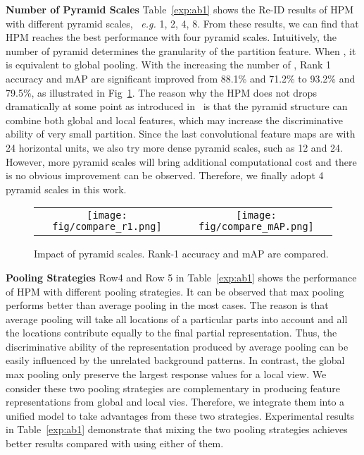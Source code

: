 \documentclass[letterpaper]{article} \usepackage{aaai19}  \usepackage{times}  \usepackage{helvet}  \usepackage{courier}  \usepackage{url}  \usepackage{graphicx}  \frenchspacing  \setlength{\pdfpagewidth}{8.5in}  \setlength{\pdfpageheight}{11in}  \usepackage{multirow}
\newcommand{\eg}{\emph{e.g. }}
\begin{document}
{\bf Number of Pyramid Scales}
Table~\ref{exp:ab1} shows the Re-ID results of HPM with different pyramid scales, ~\eg 1, 2, 4, 8. From these results, we can find that HPM reaches the best performance with four pyramid scales. Intuitively, the number of pyramid  determines the granularity of the partition feature. When , it is equivalent to global pooling. With the increasing the number of , Rank 1 accuracy and mAP are significant improved from 88.1\% and 71.2\% to 93.2\% and 79.5\%, as illustrated in Fig~\ref{exp:compare}. The reason why the HPM does not drops dramatically at some point as introduced in~\cite{sun2017beyond} is that the pyramid structure can combine both global and local features, which may increase the discriminative ability of very small partition. Since the last convolutional feature maps are with 24 horizontal units, we also try more dense pyramid scales, such as 12 and 24. However, more pyramid scales will bring additional computational cost and there is no obvious improvement can be observed. Therefore, we finally adopt 4 pyramid scales in this work.

\begin{figure}
\begin{center}
\bgroup 
 \def\arraystretch{0.2} 
 \setlength\tabcolsep{1.0pt}
\begin{tabular}{cc}
\texttt{[image: fig/compare\_r1.png]} &
\texttt{[image: fig/compare\_mAP.png]}
\end{tabular} \egroup
\end{center}
\caption{Impact of pyramid scales. Rank-1 accuracy and mAP are compared.}
\vspace{-5mm}
\label{exp:compare}
\end{figure}



{\bf Pooling Strategies}
Row4 and Row 5 in Table~\ref{exp:ab1} shows the performance of HPM with different pooling strategies. It can be observed that max pooling performs better than average pooling in the most cases. The reason is that average pooling will take all locations of a particular parts into account and all the locations contribute equally to the final partial representation. Thus, the discriminative ability of the representation produced by average pooling can be easily influenced by the unrelated background patterns. In contrast, the global max pooling only preserve the largest response values for a local view. We consider these two pooling strategies are complementary in producing feature representations from global and local vies. Therefore, we integrate them into a unified model to take advantages from these two strategies. Experimental results in Table~\ref{exp:ab1} demonstrate that mixing the two pooling strategies achieves better results compared with using either of them. 
 
\end{document}
